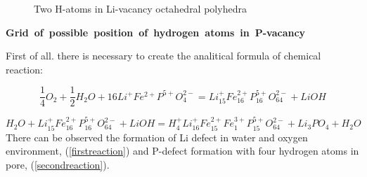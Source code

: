 \documentclass[11pt]{article}
\begin{document}
\begin{figure}[H]
\begin{minipage}[h]{1\linewidth}
\end{minipage}
\caption{ Two H-atoms in Li-vacancy octahedral polyhedra}
\label{livac}
\end{figure}

\noindent\mbox{\textbf{Grid of possible position of hydrogen atoms in P-vacancy}}

First of all. there is necessary to create the analitical formula of chemical reaction:

\begin{equation}
\frac{1}{4}O_2 + \frac{1}{2}H_2O + 16 Li^{+}Fe^{2+}P^{5+}O^{2-}_4 = Li^{+}_{15}Fe^{2+}_{16}P^{5+}_{16}O^{2-}_{64} + LiOH
\label{firstreaction}
\end{equation}

\begin{equation}
H_2O + Li^{+}_{15}Fe^{2+}_{16}P^{5+}_{16}O^{2-}_{64} + LiOH = H^{+}_{4}Li^{+}_{16}Fe^{2+}_{15}Fe^{3+}_{1}P^{5+}_{15}O^{2-}_{64} + Li_3PO_4 + H_2O
\label{secondreaction}
\end{equation}
There can be observed the formation of Li defect in water and oxygen environment, (\ref{firstreaction}) and P-defect formation with four hydrogen atoms in pore, (\ref{secondreaction}).
\end{document}
